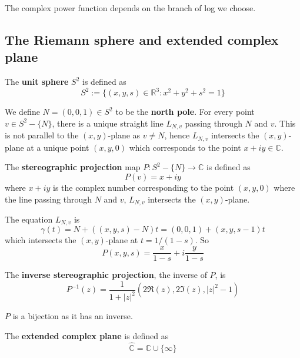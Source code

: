 \begin{remark}
	The complex power function depends on the branch of log we choose.
\end{remark}

\subsection{The Riemann sphere and extended complex plane}

\begin{definition}
	The \textbf{unit sphere} $S^2$ is defined as
	\[
		S^2 := \{ (x, y, s) \in \mathbb{R}^3: x^2 + y^2 + s^2 = 1 \}
	\]
\end{definition}

\begin{definition}
	We define $N = (0, 0, 1) \in S^2$ to be the \textbf{north pole}. For every point $v \in S^2 - \{ N \}$, there is a unique straight line $L_{N, v}$ passing through $N$ and $v$. This is not parallel to the $(x, y)$-plane as $v \ne N$, hence $L_{N, v}$ intersects the $(x, y)$-plane at a unique point $(x, y, 0)$ which corresponds to the point $x + iy \in \mathbb{C}$.
\end{definition}

\begin{definition}
	The \textbf{stereographic projection} map $P: S^2 - \{ N \} \rightarrow \mathbb{C}$ is defined as
	\[
		P(v) = x + iy
	\]
	where $x + iy$ is the complex number corresponding to the point $(x, y, 0)$ where the line passing through $N$ and $v$, $L_{N, v}$ intersects the $(x, y)$-plane.
	
	The equation $L_{N, v}$ is
	\[
		\gamma(t) = N + ((x, y, s) - N) t = (0, 0, 1) + (x, y, s - 1) t
	\]
	which intersects the $(x, y)$-plane at $t = 1 / (1 - s)$. So
	\[
		P(x, y, s) = \frac{x}{1 - s} + i \frac{y}{1 - s}
	\]
\end{definition}

\begin{definition}
	The \textbf{inverse stereographic projection}, the inverse of $P$, is
	\[
		P^{-1}(z) = \frac{1}{1 + |z|^2} (2 \Re(z), 2 \Im (z), |z|^2 - 1)
	\]
\end{definition}

\begin{remark}
	$P$ is a bijection as it has an inverse.
\end{remark}

\begin{definition}
	The \textbf{extended complex plane} is defined as
	\[
		\hat{\mathbb{C}} = \mathbb{C} \cup \{ \infty \}
	\]
\end{definition}

